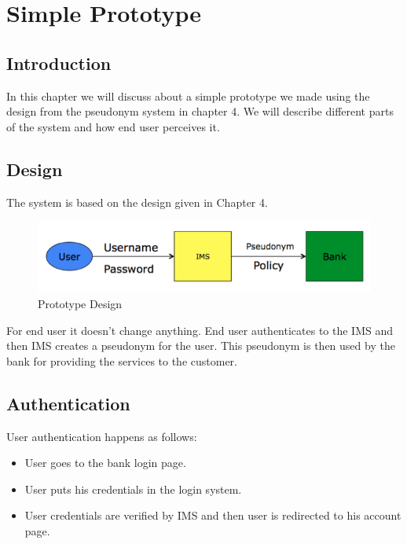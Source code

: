 \chapter{Simple Prototype}
\section{Introduction}
In this chapter we will discuss about a simple prototype we made using the design from the pseudonym system in chapter 4. We will describe different parts of the system and how end user perceives it.
\section{Design}
The system is based on the design given in Chapter 4. 
\begin{figure}[h]
	\centering
	\includegraphics[width=\textwidth]{figures/Pseudonym}
	\caption{Prototype Design}
	\label{fig:Pseudonym}
\end{figure}
For end user it doesn't change anything. End user authenticates to the IMS and then IMS creates a pseudonym for the user. This pseudonym is then used by the bank for providing the services to the customer.
\section{Authentication}
User authentication happens as follows:
\begin{itemize}
	\item User goes to the bank login page.
	\item User puts his credentials in the login system.
	\item User credentials are verified by IMS and then user is redirected to his account page.
	
\end{itemize}